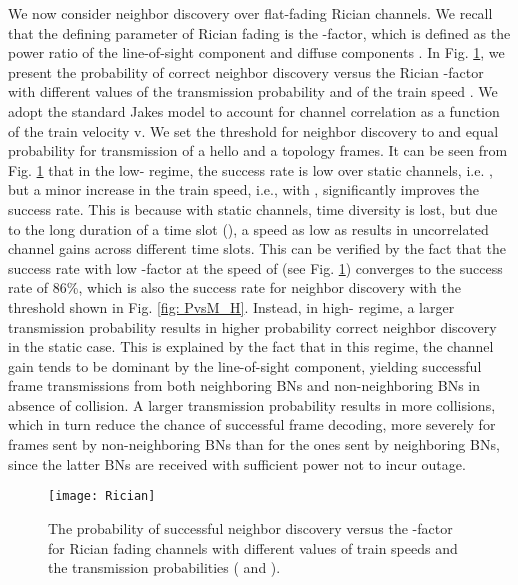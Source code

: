 \documentclass[10pt,english,two column]{IEEEtran}
\begin{document}
We now consider neighbor discovery over flat-fading Rician channels.
We recall that the defining parameter of Rician fading is the -factor,
which is defined as the power ratio of the line-of-sight component
and diffuse components \cite{Rappaport}. In Fig. \ref{fig:Rician},
we present the probability of correct neighbor discovery versus the
Rician -factor with different values of the transmission probability
 and of the train speed . We adopt the standard Jakes model
\cite{Rappaport} to account for channel correlation as a function
of the train velocity v. We set the threshold for neighbor discovery
to  and equal probability for transmission of a hello and
a topology frames. It can be seen from Fig. \ref{fig:Rician} that
in the low- regime, the success rate is low over static channels,
i.e. , but a minor increase in the train speed,
i.e., with , significantly improves the success
rate. This is because with static channels, time diversity is lost,
but due to the long duration of a time slot (),
a speed as low as  results in uncorrelated channel
gains across different time slots. This can be verified by the fact
that the success rate with low -factor at the speed of 
(see Fig. \ref{fig:Rician}) converges to the success rate of 86\%,
which is also the success rate for neighbor discovery with the threshold
 shown in Fig. \ref{fig: PvsM_H}. Instead, in high-
regime, a larger transmission probability  results in higher probability
correct neighbor discovery  in the static case. This is explained
by the fact that in this regime, the channel gain tends to be dominant
by the line-of-sight component, yielding successful frame transmissions
from both neighboring BNs and non-neighboring BNs in absence of collision.
A larger transmission probability results in more collisions, which
in turn reduce the chance of successful frame decoding, more severely
for frames sent by non-neighboring BNs than for the ones sent by neighboring
BNs, since the latter BNs are received with sufficient power not to
incur outage. 

\begin{figure}[h]
\begin{centering}
\textsf{\texttt{[image: Rician]}}
\par\end{centering}

\caption{\label{fig:Rician}The probability of successful neighbor discovery
versus the -factor for Rician fading channels with different values
of train speeds and the transmission probabilities ( and
). }
\end{figure}
\end{document}
